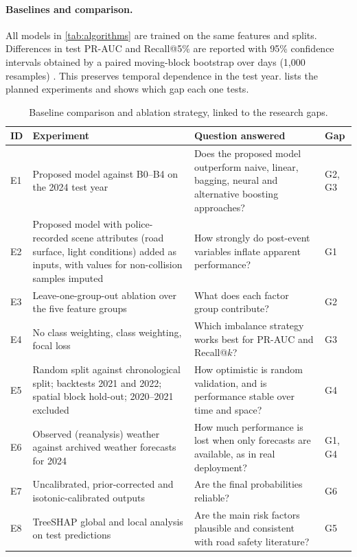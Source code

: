\paragraph{Baselines and comparison.}
All models in \cref{tab:algorithms} are trained on the same features and splits. Differences in test PR-AUC and Recall@5\% are reported with 95\% confidence intervals obtained by a paired moving-block bootstrap over days (1,000 resamples) \cite{efron1993introduction,kunsch1989jackknife}. This preserves temporal dependence in the test year.  lists the planned experiments and shows which gap each one tests.

\begin{table}[t]
\centering
\caption{Baseline comparison and ablation strategy, linked to the research gaps.}
\label{tab:experiments}
\footnotesize
\begin{tabularx}{\textwidth}{L{0.6cm} Y Y L{1.0cm}}
\toprule
\textbf{ID} & \textbf{Experiment} & \textbf{Question answered} & \textbf{Gap} \\
\midrule
E1 & Proposed model against B0--B4 on the 2024 test year & Does the proposed model outperform naive, linear, bagging, neural and alternative boosting approaches? & G2, G3 \\
E2 & Proposed model with police-recorded scene attributes (road surface, light conditions) added as inputs, with values for non-collision samples imputed & How strongly do post-event variables inflate apparent performance? & G1 \\
E3 & Leave-one-group-out ablation over the five feature groups & What does each factor group contribute? & G2 \\
E4 & No class weighting, class weighting, focal loss & Which imbalance strategy works best for PR-AUC and Recall@$k$? & G3 \\
E5 & Random split against chronological split; backtests 2021 and 2022; spatial block hold-out; 2020--2021 excluded & How optimistic is random validation, and is performance stable over time and space? & G4 \\
E6 & Observed (reanalysis) weather against archived weather forecasts for 2024 & How much performance is lost when only forecasts are available, as in real deployment? & G1, G4 \\
E7 & Uncalibrated, prior-corrected and isotonic-calibrated outputs & Are the final probabilities reliable? & G6 \\
E8 & TreeSHAP global and local analysis on test predictions & Are the main risk factors plausible and consistent with road safety literature? & G5 \\
\bottomrule
\end{tabularx}
\end{table}

